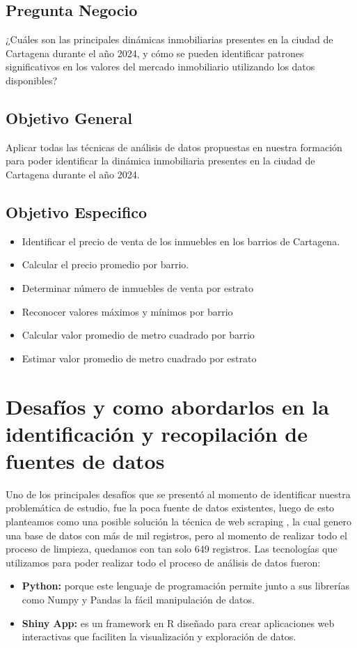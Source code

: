 \documentclass[12pt,a4paper]{article}
\begin{document}
\subsection{Pregunta Negocio}
¿Cuáles son las principales dinámicas inmobiliarias presentes en la ciudad de Cartagena durante el año 2024, y cómo se pueden identificar patrones significativos en los valores del mercado inmobiliario utilizando los datos disponibles?
\subsection{Objetivo General}
Aplicar todas las técnicas de análisis de datos propuestas en nuestra formación para poder identificar la dinámica inmobiliaria presentes en la ciudad de Cartagena durante el año 2024. 

\subsection{Objetivo Especifico}
\begin{itemize}
	\item	Identificar el precio de venta de los inmuebles en los barrios de Cartagena.
	\item Calcular el precio promedio por barrio.
	\item Determinar número de inmuebles de venta por estrato
	\item Reconocer valores máximos y mínimos por barrio
	\item Calcular valor promedio de metro cuadrado por barrio
	\item Estimar valor promedio de metro cuadrado por estrato
\end{itemize}


\section{Desafíos y como abordarlos en la identificación y recopilación de fuentes de datos}

Uno de los principales desafíos que se presentó al momento de identificar nuestra problemática de estudio, fue la poca fuente de datos existentes, luego de esto planteamos como una posible solución la técnica de web scraping , la cual genero una base de datos con más de mil registros, pero al momento de realizar todo el proceso de limpieza, quedamos con tan solo 649 registros. 
Las tecnologías que utilizamos para poder realizar todo el proceso de análisis de datos fueron:
\begin{itemize}
	\item [] \textbf{Python:} porque este lenguaje de programación permite junto a sus librerías como  Numpy y Pandas la fácil manipulación de datos.
	\item [] \textbf{Shiny App:} es un framework en R diseñado para crear aplicaciones web interactivas que faciliten la visualización y exploración de datos.
\end{itemize} 
\end{document}
